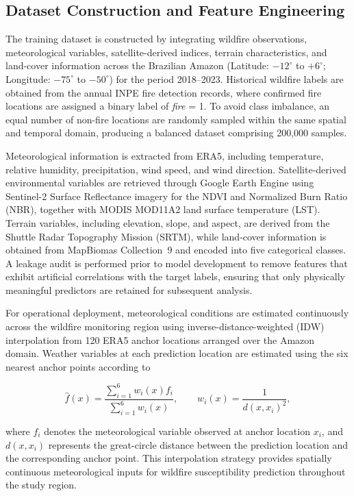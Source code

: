 \documentclass{ieeeaccess}
\begin{document}
\subsection{Dataset Construction and Feature Engineering}

The training dataset is constructed by integrating wildfire observations, meteorological variables, satellite-derived indices, terrain characteristics, and land-cover information across the Brazilian Amazon (Latitude: $-12^{\circ}$ to $+6^{\circ}$; Longitude: $-75^{\circ}$ to $-50^{\circ}$) for the period 2018--2023. Historical wildfire labels are obtained from the annual INPE fire detection records, where confirmed fire locations are assigned a binary label of \textit{fire} = 1. To avoid class imbalance, an equal number of non-fire locations are randomly sampled within the same spatial and temporal domain, producing a balanced dataset comprising 200,000 samples.

Meteorological information is extracted from ERA5, including temperature, relative humidity, precipitation, wind speed, and wind direction. Satellite-derived environmental variables are retrieved through Google Earth Engine using Sentinel-2 Surface Reflectance imagery for the NDVI and Normalized Burn Ratio (NBR), together with MODIS MOD11A2 land surface temperature (LST). Terrain variables, including elevation, slope, and aspect, are derived from the Shuttle Radar Topography Mission (SRTM), while land-cover information is obtained from MapBiomas Collection~9 and encoded into five categorical classes. A leakage audit is performed prior to model development to remove features that exhibit artificial correlations with the target labels, ensuring that only physically meaningful predictors are retained for subsequent analysis.

For operational deployment, meteorological conditions are estimated continuously across the wildfire monitoring region using inverse-distance-weighted (IDW) interpolation from 120 ERA5 anchor locations arranged over the Amazon domain. Weather variables at each prediction location are estimated using the six nearest anchor points according to

\begin{equation}
\hat{f}(x)=
\frac{\displaystyle\sum_{i=1}^{6}w_i(x)f_i}
{\displaystyle\sum_{i=1}^{6}w_i(x)},
\qquad
w_i(x)=\frac{1}{d(x,x_i)^2},
\label{eq:idw}
\end{equation}

where $f_i$ denotes the meteorological variable observed at anchor location $x_i$, and $d(x,x_i)$ represents the great-circle distance between the prediction location and the corresponding anchor point. This interpolation strategy provides spatially continuous meteorological inputs for wildfire susceptibility prediction throughout the study region.
\end{document}
